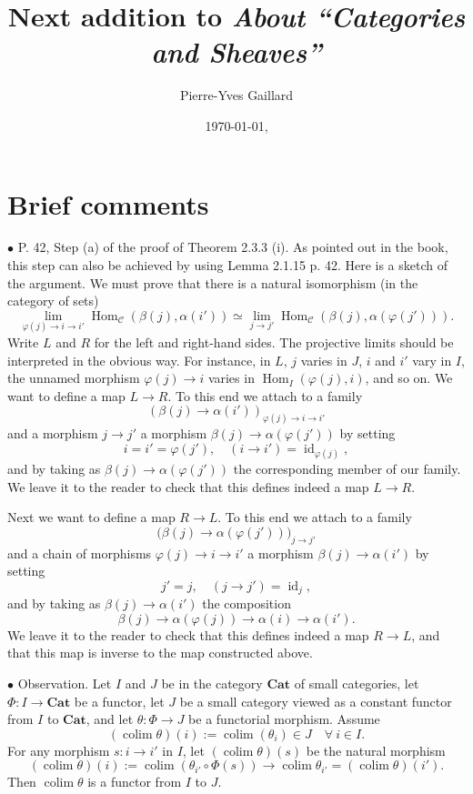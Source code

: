 \documentclass[12pt]{article}
\title{Next addition to \em{About ``Categories and Sheaves''}}
\author{Pierre-Yves Gaillard}
\date{\today, \currenttime}
\newcommand{\bu}{\bullet}
\newcommand{\n}{\noindent}
\newcommand{\C}{\mathcal C}
\newcommand{\Cat}{\textbf{Cat}}
\newcommand{\p}{\varphi}
\newcommand{\be}{\begin{equation}}
\newcommand{\ee}{\end{equation}}
\newcommand{\cn}{(See (\ref{convnot}) p. \pageref{convnot} for an explanation of the notation.) }
\DeclareMathOperator*{\co}{colim}
\DeclareMathOperator{\id}{id}
\DeclareMathOperator{\h}{Hom}
\begin{document}
%
\maketitle
%
% 
% 
\section{Brief comments}
% 
\n$\bu$ P. 42, Step (a) of the proof of Theorem 2.3.3 (i). As pointed out in the book, this step can also be achieved by using Lemma 2.1.15 p. 42. Here is a sketch of the argument. We must prove that there is a natural isomorphism (in the category of sets) 
$$
\lim_{\p(j)\to i\to i'}\h_\C(\beta(j),\alpha(i'))\simeq
\lim_{j\to j'}\h_\C(\beta(j),\alpha(\p(j'))). 
$$
Write $L$ and $R$ for the left and right-hand sides. The projective limits should be interpreted in the obvious way. For instance, in $L$, $j$ varies in $J$, $i$ and $i'$ vary in $I$, the unnamed morphism $\p(j)\to i$ varies in $\h_I(\p(j),i)$, and so on. We want to define a map $L\to R$. To this end we attach to a family 
$$
(\beta(j)\to\alpha(i'))_{\p(j)\to i\to i'}
$$ 
and a morphism $j\to j'$ a morphism $\beta(j)\to\alpha(\p(j'))$ by setting 
$$
i=i'=\p(j'),\quad(i\to i')=\id_{\p(j)},
$$ 
and by taking as $\beta(j)\to\alpha(\p(j'))$ the corresponding member of our family. We leave it to the reader to check that this defines indeed a map $L\to R$. 

Next we want to define a map $R\to L$. To this end we attach to a family 
$$
\big(\beta(j)\to\alpha(\p(j'))\big)_{j\to j'}
$$ 
and a chain of morphisms $\p(j)\to i\to i'$ a morphism $\beta(j)\to\alpha(i')$ by setting 
$$
j'=j,\quad(j\to j')=\id_{j},
$$ 
and by taking as $\beta(j)\to\alpha(i')$ the composition 
$$
\beta(j)\to\alpha(\p(j))\to\alpha(i)\to\alpha(i'). 
$$ 
We leave it to the reader to check that this defines indeed a map $R\to L$, and that this map is inverse to the map constructed above. 


\n$\bu$ Observation. Let $I$ and $J$ be in the category $\Cat$ of small categories, let $\Phi:I\to\Cat$ be a functor, let $J$ be a small category viewed as a constant functor from $I$ to $\Cat$, and let $\theta:\Phi\to J$ be a functorial morphism. Assume 
%
\be\label{52} 
(\co\theta)(i):=\co(\theta_i)\in J\quad\forall\ i\in I. 
\ee 
% 
For any morphism $s:i\to i'$ in $I$, let $(\co\theta)(s)$ be the natural morphism 
$$
(\co\theta)(i):=\co(\theta_{i'}\circ\Phi(s))\to
\co\theta_{i'}=(\co\theta)(i'). 
$$  
Then $\co\theta$ is a functor from $I$ to $J$. 
\end{document}
